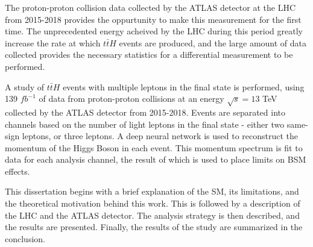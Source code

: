 The proton-proton collision data collected by the ATLAS detector at the LHC from 2015-2018 provides the oppurtunity to make this measurement for the first time. The unprecedented energy acheived by the LHC during this period greatly increase the rate at which $t\bar{t}H$ events are produced, and the large amount of data collected provides the necessary statistics for a differential measurement to be performed.

A study of $t\bar{t}H$ events with multiple leptons in the final state is performed, using 139 $fb^{-1}$ of data from proton-proton collisions at an energy $\sqrt{s} = 13$ TeV collected by the ATLAS detector from 2015-2018. Events are separated into channels based on the number of light leptons in the final state - either two same-sign leptons, or three leptons. A deep neural network is used to reconstruct the momentum of the Higgs Boson in each event. This momentum spectrum is fit to data for each analysis channel, the result of which is used to place limits on BSM effects.

This dissertation begins with a brief explanation of the SM, its limitations, and the theoretical motivation behind this work. This is followed by a description of the LHC and the ATLAS detector. The analysis strategy is then described, and the results are presented. Finally, the results of the study are summarized in the conclusion.


